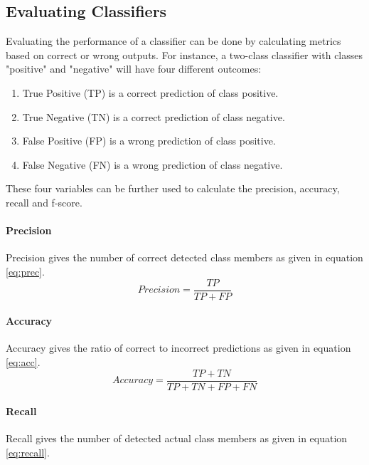 \documentclass[USenglish]{ifimaster}  %
\begin{document}
	
	
\subsection{Evaluating Classifiers}\label{subsec:evalclf}
Evaluating the performance of a classifier can be done by calculating metrics based on correct or wrong outputs. For instance, a two-class classifier with classes "positive" and "negative" will have four different outcomes:
	
	\begin{enumerate}
		\item True Positive (TP) is a correct prediction of class positive.
		\item True Negative (TN) is a correct prediction of class negative.
		\item False Positive (FP) is a wrong prediction of class positive.
		\item False Negative (FN) is a wrong prediction of class negative.
	\end{enumerate}
	
These four variables can be further used to calculate the precision, accuracy, recall and f-score.
	
	\paragraph{Precision}
	Precision gives the number of correct detected class members as given in equation \ref{eq:prec}.
	\begin{equation}
	Precision = \frac{TP}{TP + FP}
	\label{eq:prec}
	\end{equation}
	
	\paragraph{Accuracy}
	Accuracy gives the ratio of correct to incorrect predictions as given in equation \ref{eq:acc}.
	\begin{equation}
	Accuracy = \frac{TP + TN}{TP + TN + FP + FN}
	\label{eq:acc}
	\end{equation}
	
	\paragraph{Recall}
	Recall gives the number of detected actual class members as given in equation \ref{eq:recall}.
	
\end{document}
